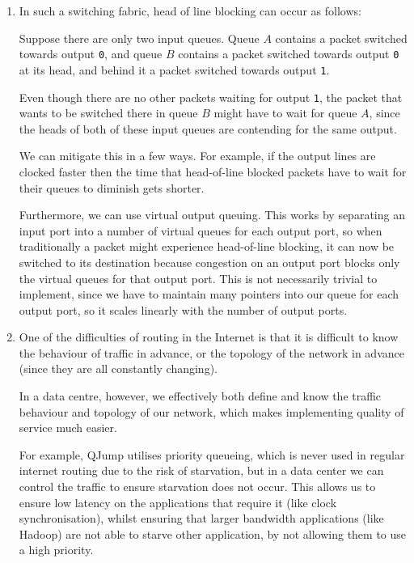 \documentclass[12pt]{article}
\begin{document}
\begin{enumerate}[label=(\alph*)]
    \item
        In such a switching fabric, head of line blocking can occur as follows:

        Suppose there are only two input queues. Queue $A$  contains a packet switched towards output \texttt{0}, and queue $B$ contains a packet switched towards output \texttt{0} at its head, and behind it a packet switched towards output \texttt{1}.

        Even though there are no other packets waiting for output \texttt{1}, the packet that wants to be switched there in queue $B$ might have to wait for queue $A$, since the heads of both of these input queues are contending for the same output.

        We can mitigate this in a few ways. For example, if the output lines are clocked faster then the time that head-of-line blocked packets have to wait for their queues to diminish gets shorter.

        Furthermore, we can use virtual output queuing. This works by separating an input port into a number of virtual queues for each output port, so when traditionally a packet might experience head-of-line blocking, it can now be switched to its destination because congestion on an output port blocks only the virtual queues for that output port. This is not necessarily trivial to implement, since we have to maintain many pointers into our queue for each output port, so it scales linearly with the number of output ports.

    \item

        One of the difficulties of routing in the Internet is that it is difficult to know the behaviour of traffic in advance, or the topology of the network in advance (since they are all constantly changing).

        In a data centre, however, we effectively both define and know the traffic behaviour and topology of our network, which makes implementing quality of service much easier.

        For example, QJump utilises priority queueing, which is never used in regular internet routing due to the risk of starvation, but in a data center we can control the traffic to ensure starvation does not occur. This allows us to ensure low latency on the applications that require it (like clock synchronisation), whilst ensuring that larger bandwidth applications (like Hadoop) are not able to starve other application, by not allowing them to use a high priority.
        
    \end{enumerate}
\end{document}
